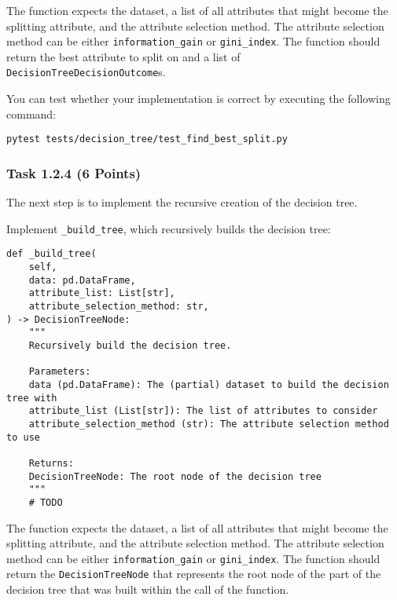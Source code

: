 \documentclass[
english,
smallborders
]{i6prcsht}
\newcommand{\points}[1]{\hfill \color{red}(#1 Points)\color{black}}
\begin{document}
\vspace*{0.1cm}

The function expects the dataset, a list of all attributes that might become the splitting attribute, and the attribute selection method. The attribute selection method can be either \texttt{information\_gain} or \texttt{gini\_index}. The function should return the best attribute to split on and a list of \texttt{DecisionTreeDecisionOutcome}s.

You can test whether your implementation is correct by executing the following command:

\vspace*{0.3cm}

\begin{lstlisting}
pytest tests/decision_tree/test_find_best_split.py
\end{lstlisting}

\vspace*{0.1cm}

\subsubsection*{Task 1.2.4 \points{6}}

The next step is to implement the recursive creation of the decision tree.

Implement \texttt{\_build\_tree}, which recursively builds the decision tree:

\vspace*{0.3cm}

\begin{lstlisting}
def _build_tree(
	self,
	data: pd.DataFrame,
	attribute_list: List[str],
	attribute_selection_method: str,
) -> DecisionTreeNode:
    """
    Recursively build the decision tree.

	Parameters:
	data (pd.DataFrame): The (partial) dataset to build the decision tree with
	attribute_list (List[str]): The list of attributes to consider
	attribute_selection_method (str): The attribute selection method to use

	Returns:
	DecisionTreeNode: The root node of the decision tree
	"""
	# TODO
\end{lstlisting}

\vspace*{0.1cm}

The function expects the dataset, a list of all attributes that might become the splitting attribute, and the attribute selection method. The attribute selection method can be either \texttt{information\_gain} or \texttt{gini\_index}. The function should return the \texttt{DecisionTreeNode} that represents the root node of the part of the decision tree that was built within the call of the function.
\end{document}
